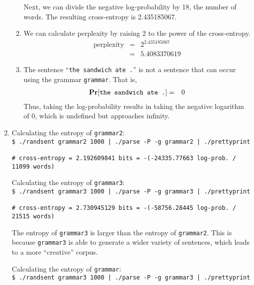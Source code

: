 \documentclass[11pt]{article}
\newcommand{\prob}[1]{\ensuremath{\text{{\bf Pr}$\left[#1\right]$}}}
\newcommand{\code}[1]{\texttt{#1}}
\newcommand{\codebox}[1]{\colorbox{codegray}{\texttt{#1}}}
\begin{document}
\begin{enumerate}
\begin{enumerate}[label=(\roman*)]
            Next, we can divide the negative log-probability by 18, the number of words. The resulting cross-entropy is 2.435185067.
		\item 
			We can calculate perplexity by raising 2 to the power of the cross-entropy.
			\begin{eqnarray*}
				\text{perplexity} &=& 2^{2.435185067} \\
					&=& 5.4083370619
			\end{eqnarray*}
		\item
			The sentence ``\code{the sandwich ate .}'' is not a sentence that can occur using the grammar \code{grammar}. That is, 
			\begin{eqnarray*}
				\prob{\code{the sandwich ate .}} &=& 0
			\end{eqnarray*}
			Thus, taking the log-probability results in taking the negative logarithm of 0, which is undefined but approaches infinity.
	\end{enumerate}
	\item
		Calculating the entropy of \code{grammar2}: \vspace{4pt} \\
		\codebox{\$ ./randsent grammar2 1000 | ./parse -P -g grammar2 | ./prettyprint \ \ \ \ \ \ \ \ \ \ \ \ \ } \\
		\codebox{\# cross-entropy = 2.192609841 bits = -(-24335.77663 log-prob. / 11099 words)\ \ \ \ }
		
		Calculating the entropy of \code{grammar3}: \vspace{4pt} \\
		\codebox{\$ ./randsent grammar3 1000 | ./parse -P -g grammar3 | ./prettyprint \ \ \ \ \ \ \ \ \ \ \ \ \ } \\
		\codebox{\# cross-entropy = 2.730945129 bits = -(-58756.28445 log-prob. / 21515 words)\ \ \ \ }	
			
                The entropy of \code{grammar3} is larger than the entropy of \code{grammar2}.  This is because \code{grammar3} is able to generate a wider variety of sentences, which leads to a more ``creative'' corpus.
                
                Calculating the entropy of \code{grammar}: \vspace{4pt} \\
                \codebox{\$ ./randsent grammar3 1000 | ./parse -P -g grammar3 | ./prettyprint \ \ \ \ \ \ \ \ \ \ \ \ \ }
                

\end{enumerate}
\end{document}

